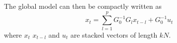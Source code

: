 \documentclass[preprint, 11pt]{elsarticle}
\newcommand{\?}{\stackrel{?}{=}}
\begin{document}
The global model can then be compactly written as
\begin{equation}
  \label{eq:6}
  x_{t} = \sum_{l=1}^{p}G_{0}^{-1}G_{l }x_{t-l} + G_{0}^{-1}u_{t}
\end{equation}
where $x_{t}$ $x_{t-l}$ and $u_{t}$ are stacked vectors of length $kN$.








\end{document}
